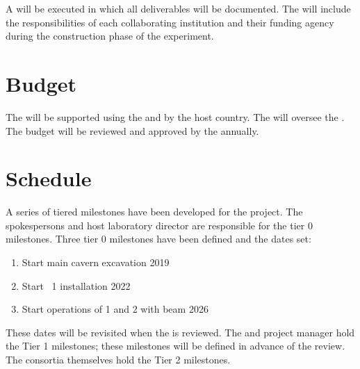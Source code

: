 A  will be executed in which all deliverables will be
documented. The  will include the responsibilities of each
collaborating institution and their funding agency during the
construction phase of the experiment.

\section{Budget}
\label{sec:fdsp-coord-budget}

The   will be supported using the
 and by the host country. The  will oversee
the .  The  budget will be reviewed and
approved by the  annually.

\section{Schedule}
\label{sec:fdsp-coord-controls}

A series of tiered milestones have been developed for the 
project. The spokespersons and host laboratory director are
responsible for the tier 0 milestones. Three tier 0 milestones have
been defined and the dates set:
\begin{enumerate}
\item Start main cavern excavation \hspace{2.58in} 2019
\item Start ~1 installation \hspace{2.1in} 2022
\item Start operations of  1 and 2 with beam \hspace{1in} 2026
\end{enumerate}
These dates will be revisited when the  is reviewed. The
 and  project manager hold the Tier 1
milestones; these milestones will be defined in advance of the
 review. The consortia themselves hold the Tier 2
milestones.

